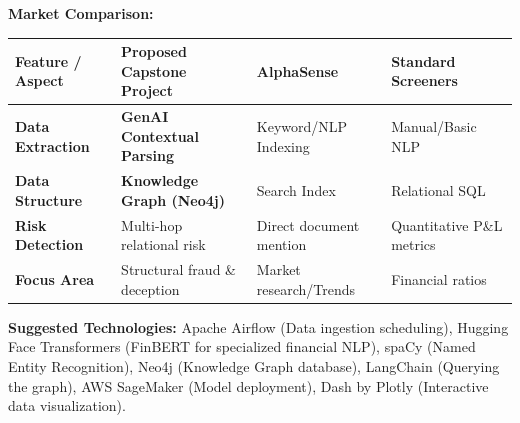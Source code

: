 \documentclass[11pt, a4paper]{article}
\begin{document}
\vspace{0.4cm}
\noindent\textbf{Market Comparison:}

\vspace{0.2cm}
\noindent\renewcommand{\arraystretch}{1.5}
\begin{tabular}{|p{3.5cm}|p{4.5cm}|p{3.8cm}|p{3.8cm}|}
\hline
\textbf{Feature / Aspect} & \textbf{Proposed Capstone Project} & \textbf{AlphaSense} & \textbf{Standard Screeners} \\
\hline
\textbf{Data Extraction} & \textbf{GenAI Contextual Parsing} & Keyword/NLP Indexing & Manual/Basic NLP \\
\hline
\textbf{Data Structure} & \textbf{Knowledge Graph (Neo4j)} & Search Index & Relational SQL \\
\hline
\textbf{Risk Detection} & Multi-hop relational risk & Direct document mention & Quantitative P\&L metrics \\
\hline
\textbf{Focus Area} & Structural fraud \& deception & Market research/Trends & Financial ratios \\
\hline
\end{tabular}

\vspace{0.4cm}
\noindent\textbf{Suggested Technologies:} Apache Airflow (Data ingestion scheduling), Hugging Face Transformers (FinBERT for specialized financial NLP), spaCy (Named Entity Recognition), Neo4j (Knowledge Graph database), LangChain (Querying the graph), AWS SageMaker (Model deployment), Dash by Plotly (Interactive data visualization).
\end{document}
